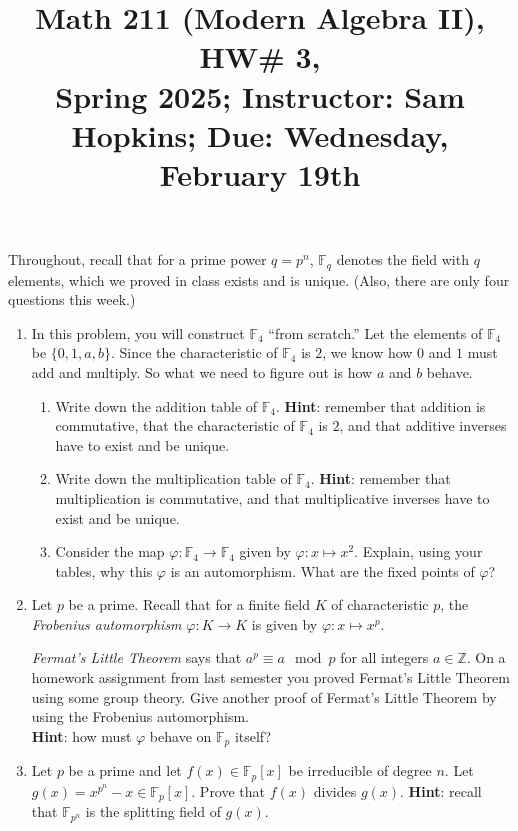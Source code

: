 \documentclass[11pt]{article}
\title{Math 211 (Modern Algebra II), HW\# 3, \\ {\normalsize Spring 2025; Instructor: Sam Hopkins; Due: Wednesday, February 19th}}
\date{}
\begin{document}
\maketitle

\thispagestyle{empty}

Throughout, recall that for a prime power $q=p^n$, $\mathbb{F}_q$ denotes the field with $q$ elements, which we proved in class exists and is unique. (Also, there are only four questions this week.)

\begin{enumerate}

\item In this problem, you will construct $\mathbb{F}_4$ ``from scratch.'' Let the elements of $\mathbb{F}_4$ be $\{0,1,a,b\}$. Since the characteristic of $\mathbb{F}_4$ is $2$, we know how $0$ and $1$ must add and multiply. So what we need to figure out is how $a$ and $b$ behave.
\begin{enumerate}
\item Write down the addition table of $\mathbb{F}_4$. {\bf Hint}: remember that addition is commutative, that the characteristic of $\mathbb{F}_4$ is $2$, and that additive inverses have to exist and be unique.
\item Write down the multiplication table of $\mathbb{F}_4$. {\bf Hint}: remember that multiplication is commutative, and that multiplicative inverses have to exist and be unique.
\item Consider the map $\varphi\colon \mathbb{F}_4 \to \mathbb{F}_4$ given by $\varphi\colon x \mapsto x^2$. Explain, using your tables, why this $\varphi$ is an automorphism. What are the fixed points of $\varphi$?
\end{enumerate}

\item Let $p$ be a prime. Recall that for a finite field $K$ of characteristic $p$, the \emph{Frobenius automorphism} $\varphi\colon K \to K$ is given by $\varphi\colon x \mapsto x^p$.

\emph{Fermat's Little Theorem} says that $a^p \equiv a \mod p$ for all integers $a\in\mathbb{Z}$. On a homework assignment from last semester you proved Fermat's Little Theorem using some group theory. Give another proof of Fermat's Little Theorem by using the Frobenius automorphism. \\{\bf Hint}: how must $\varphi$ behave on $\mathbb{F}_p$ itself?

\item Let $p$ be a prime and let $f(x) \in \mathbb{F}_p[x]$ be irreducible of degree $n$. Let $g(x) = x^{p^n}-x\in \mathbb{F}_p[x]$. Prove that $f(x)$ divides $g(x)$. {\bf Hint}: recall that $\mathbb{F}_{p^n}$ is the splitting field of $g(x)$.


\end{enumerate}
\end{document}
